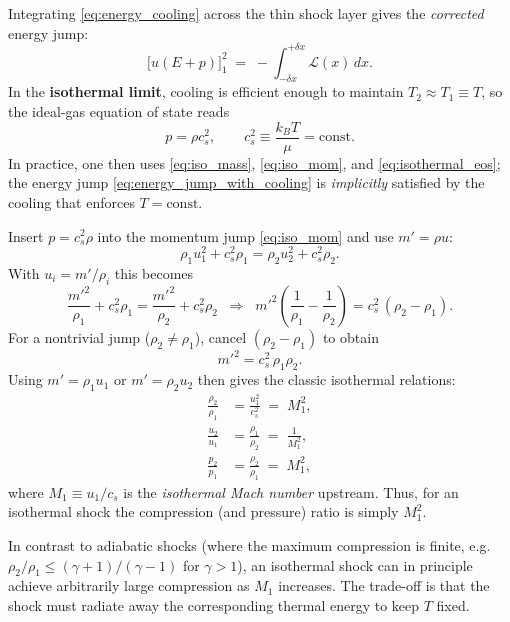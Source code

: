Integrating \eqref{eq:energy_cooling} across the thin shock layer gives the \emph{corrected} energy jump:
\begin{equation}
\big[u(E+p)\big]_1^2 \;=\; - \int_{-\delta x}^{+\delta x} \mathcal{L}(x)\,dx.
\label{eq:energy_jump_with_cooling}
\end{equation}
In the \textbf{isothermal limit}, cooling is efficient enough to maintain $T_2 \approx T_1 \equiv T$, so the ideal-gas equation of state reads
\begin{equation}
p = \rho c_s^2, \qquad c_s^2 \equiv \frac{k_B T}{\mu} = \text{const.}
\label{eq:isothermal_eos}
\end{equation}
In practice, one then uses \eqref{eq:iso_mass}, \eqref{eq:iso_mom}, and \eqref{eq:isothermal_eos}; the energy jump \eqref{eq:energy_jump_with_cooling} is \emph{implicitly} satisfied by the cooling that enforces $T=\text{const.}$

Insert $p=c_s^2\rho$ into the momentum jump \eqref{eq:iso_mom} and use $m'=\rho u$:
\[
\rho_1 u_1^2 + c_s^2 \rho_1 
= \rho_2 u_2^2 + c_s^2 \rho_2.
\]
With $u_i = m'/\rho_i$ this becomes
\[
\frac{m'^2}{\rho_1} + c_s^2 \rho_1
= \frac{m'^2}{\rho_2} + c_s^2 \rho_2
\;\;\Longrightarrow\;\;
m'^2\!\left(\frac{1}{\rho_1}-\frac{1}{\rho_2}\right)
= c_s^2\,(\rho_2-\rho_1).
\]
For a nontrivial jump ($\rho_2\neq\rho_1$), cancel $(\rho_2-\rho_1)$ to obtain
\begin{equation}
m'^2 = c_s^2\,\rho_1\rho_2.
\label{eq:mprime_iso}
\end{equation}
Using $m'=\rho_1 u_1$ or $m'=\rho_2 u_2$ then gives the classic isothermal relations:
\begin{align}
\frac{\rho_2}{\rho_1} 
&= \frac{u_1^2}{c_s^2} \;=\; M_1^2, \label{eq:iso_density_jump}\\[4pt]
\frac{u_2}{u_1} 
&= \frac{\rho_1}{\rho_2} \;=\; \frac{1}{M_1^2}, \label{eq:iso_velocity_jump}\\[4pt]
\frac{p_2}{p_1} 
&= \frac{\rho_2}{\rho_1} \;=\; M_1^2, \label{eq:iso_pressure_jump}
\end{align}
where $M_1 \equiv u_1/c_s$ is the \emph{isothermal Mach number} upstream. Thus, for an isothermal shock the compression (and pressure) ratio is simply $M_1^2$.

\begin{remark}
In contrast to adiabatic shocks (where the maximum compression is finite, e.g.\ $\rho_2/\rho_1 \le (\gamma+1)/(\gamma-1)$ for $\gamma>1$), an isothermal shock can in principle achieve arbitrarily large compression as $M_1$ increases. The trade-off is that the shock must radiate away the corresponding thermal energy to keep $T$ fixed.
\end{remark}

